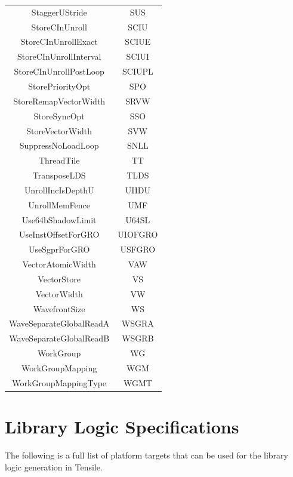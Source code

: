 \documentclass[]{article}
\begin{document}
\begin{center}
\begin{small}
\begin{longtable}{ |c|c| }
 StaggerUStride & SUS \\
 StoreCInUnroll & SCIU \\
 StoreCInUnrollExact & SCIUE \\
 StoreCInUnrollInterval & SCIUI \\
 StoreCInUnrollPostLoop & SCIUPL \\
 StorePriorityOpt & SPO \\
 StoreRemapVectorWidth & SRVW \\
 StoreSyncOpt & SSO \\
 StoreVectorWidth & SVW \\
 SuppressNoLoadLoop & SNLL \\
 ThreadTile & TT \\
 TransposeLDS & TLDS \\
 UnrollIncIsDepthU & UIIDU \\
 UnrollMemFence & UMF \\
 Use64bShadowLimit & U64SL \\
 UseInstOffsetForGRO & UIOFGRO \\
 UseSgprForGRO & USFGRO \\
 VectorAtomicWidth & VAW \\
 VectorStore & VS \\
 VectorWidth & VW \\
 WavefrontSize & WS \\
 WaveSeparateGlobalReadA & WSGRA \\
 WaveSeparateGlobalReadB & WSGRB \\
 WorkGroup & WG \\
 WorkGroupMapping & WGM \\
 WorkGroupMappingType & WGMT \\
 \hline
\end{longtable}
\end{small}
\end{center}

\section{Library Logic Specifications}
\label{sec:appendixD}

The following is a full list of platform targets that can be used for the library logic generation in Tensile.
\end{document}
